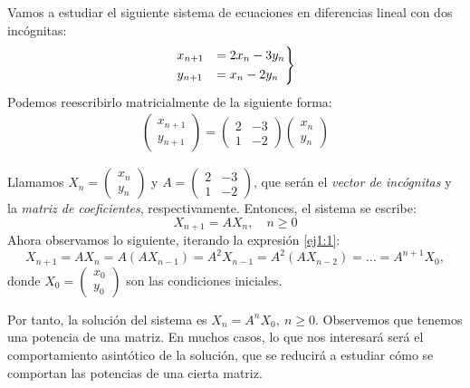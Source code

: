 \begin{ejemplo}
Vamos a estudiar el siguiente sistema de ecuaciones en diferencias lineal con dos incógnitas:
  $$\begin{rcases}
    x_{n+1} &= 2x_n - 3y_n \\
    y_{n+1} &= x_n - 2y_n
  \end{rcases}$$
Podemos reescribirlo matricialmente de la siguiente forma:
  \begin{align*}
    \left(
    \begin{array}{c}
      x_{n+1} \\
      y_{n+1}
    \end{array} \right)
    = \left(
    \begin{array}{cc}
      2 & -3 \\
      1 & -2
    \end{array} \right) \left(
          \begin{array}{c}
            x_n \\
            y_n
          \end{array}
    \right)
  \end{align*}

  Llamamos $X_n =
  \begin{pmatrix}
    x_n \\
    y_n
  \end{pmatrix}$ y $A =
  \begin{pmatrix}
    2 & -3 \\
    1 & -2
  \end{pmatrix}$, que serán el \textit{vector de incógnitas} y la \textit{matriz de coeficientes}, respectivamente. Entonces, el sistema se escribe:
  \begin{equation} \label{ej1:1}
	X_{n+1} = AX_n,\quad n \ge 0
\end{equation}
  Ahora observamos lo siguiente, iterando la expresión \eqref{ej1:1}:
  $$X_{n+1} = AX_n = A(AX_{n-1}) = A^2X_{n-1} = A^2(AX_{n-2}) = \hdots =
  A^{n+1}X_0,$$ donde $X_0 =
  \begin{pmatrix}
    x_0 \\
    y_0
  \end{pmatrix}$ son las condiciones iniciales.

  Por tanto, la solución del sistema es $X_n = A^nX_0, \ n \geq 0$. Observemos que tenemos una potencia de una matriz. En muchos casos, lo que nos interesará será el comportamiento asintótico de la solución, que se reducirá a estudiar cómo se comportan las potencias de una cierta matriz.

\end{ejemplo}

